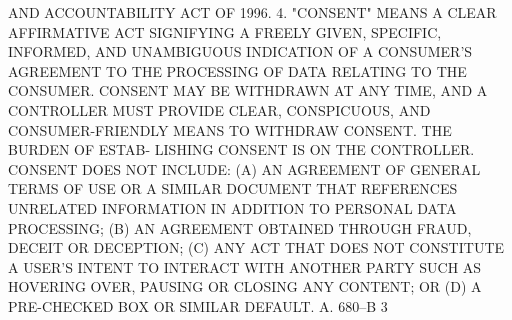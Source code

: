  AND ACCOUNTABILITY ACT OF 1996.
   4. "CONSENT" MEANS A CLEAR AFFIRMATIVE ACT SIGNIFYING A FREELY  GIVEN,
 SPECIFIC, INFORMED, AND UNAMBIGUOUS INDICATION OF A CONSUMER'S AGREEMENT
 TO  THE  PROCESSING  OF  DATA RELATING TO THE CONSUMER.   CONSENT MAY BE
 WITHDRAWN AT ANY TIME, AND A CONTROLLER MUST PROVIDE CLEAR, CONSPICUOUS,
 AND CONSUMER-FRIENDLY MEANS TO WITHDRAW CONSENT. THE  BURDEN  OF  ESTAB-
 LISHING  CONSENT IS ON THE CONTROLLER.  CONSENT DOES NOT INCLUDE: (A) AN
 AGREEMENT OF GENERAL TERMS OF USE OR A SIMILAR DOCUMENT THAT  REFERENCES
 UNRELATED  INFORMATION  IN  ADDITION TO PERSONAL DATA PROCESSING; (B) AN
 AGREEMENT OBTAINED THROUGH FRAUD, DECEIT OR DECEPTION; (C) ANY ACT  THAT
 DOES  NOT CONSTITUTE A USER'S INTENT TO INTERACT WITH ANOTHER PARTY SUCH
 AS HOVERING OVER, PAUSING OR CLOSING ANY CONTENT; OR (D)  A  PRE-CHECKED
 BOX OR SIMILAR DEFAULT.
 A. 680--B                           3
 
